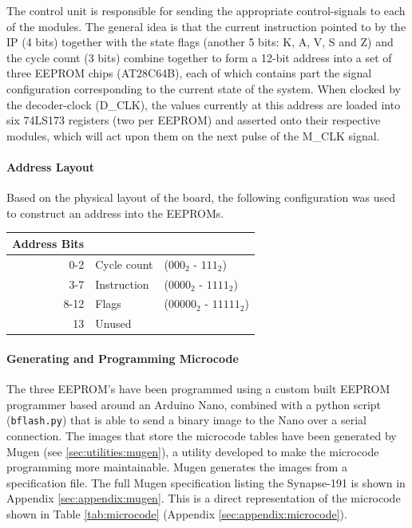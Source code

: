 The control unit is responsible for sending the appropriate control-signals to each of the modules. The general idea is that the current instruction pointed to by the IP (4 bits) together with the state flags (another 5 bits: K, A, V, S and Z) and the cycle count (3 bits) combine together to form a 12-bit address into a set of three EEPROM chips (AT28C64B), each of which contains part the signal configuration corresponding to the current state of the system. When clocked by the decoder-clock (D\_CLK), the values currently at this address are loaded into six 74LS173 registers (two per EEPROM) and asserted onto their respective modules, which will act upon them on the next pulse of the M\_CLK signal.

\paragraph{Address Layout} Based on the physical layout of the board, the following configuration was used to construct an address into the EEPROMs.
\\
\begin{center}
\begin{tabular}{r|ll} 
  Address Bits & \\ \hline
  0-2  & Cycle count & ($000_2$ - $111_2$) \\
  3-7  & Instruction & ($0000_2$ - $1111_2$) \\
  8-12 & Flags  & ($00000_2$ - $11111_2$) \\
  13   & Unused & 
\end{tabular}
\end{center}


\paragraph{Generating and Programming Microcode} The three EEPROM's have been programmed using a custom built EEPROM programmer based around an Arduino Nano, combined with a python script (\texttt{bflash.py}) that is able to send a binary image to the Nano over a serial connection. The images that store the microcode tables have been generated by Mugen (see \ref{sec:utilities:mugen}), a utility developed to make the microcode programming more maintainable. Mugen generates the images from a specification file. The full Mugen specification listing the Synapse-191 is shown in Appendix \ref{sec:appendix:mugen}. This is a direct representation of the microcode shown in Table \ref{tab:microcode} (Appendix \ref{sec:appendix:microcode}).




